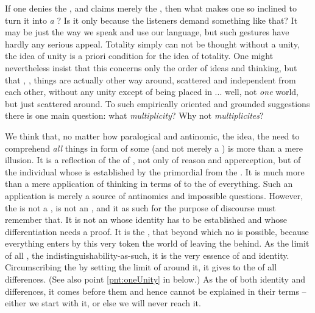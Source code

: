 If one denies the , and claims merely the , then what makes one so inclined to turn it into {\em a}
?  Is it only because the listeners demand something like that? It
may be just the way we speak and use our language, but such 
gestures have hardly any serious appeal.  Totality simply can not be thought
without a unity, the idea of unity is a priori condition for the idea of
totality. One might nevertheless insist that this concerns only the order of
ideas and thinking, but that , , things are
actually other way around, scattered and independent from each other, without
any unity except of being placed in ... well, not {\em one} world, but just
scattered around. To such empirically oriented and grounded suggestions there is
one main question: what {\em multiplicity}? Why not {\em multiplicites}? 

\pa
We think that, no matter how paralogical and antinomic, the idea, the need to
comprehend {\em all} things in form of some  (and not merely a
) is more than a mere illusion.
It is a reflection %
of the  of , not only of reason and 
apperception, but of the individual  whose  is
established by the primordial  from the .  It is much
more than a mere application of  thinking in terms of
 to the  of everything.  Such an
application is merely a source of antinomies and impossible questions.  However,
the  is not a , is not an , and 
 it as such for the purpose of discourse must remember that.  It is
not an  whose identity has to be established and whose
differentiation needs a proof.  It is the , that beyond which no
 is possible, because everything  enters by
this very token the world of  leaving the 
behind. As the limit of all , the indistinguishability-as-such,
it is the very essence of  and identity. Circumscribing the  by setting the limit of  around it, it gives
 to the  of all differences.  (See also point
\ref{pnt:oneUnity} in  below.) As the  of both
identity and differences, it comes before them and hence cannot be explained in
their terms -- either we start with it, or else we will never reach it.


